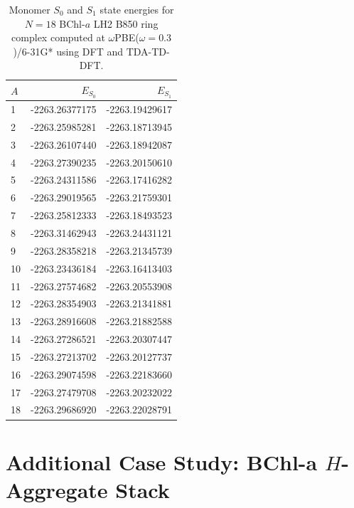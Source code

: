 \begin{table}[h!]
\begin{center}
\caption{
Monomer $S_0$ and $S_1$ state energies for $N=18$ BChl-$a$ LH2 B850 ring
complex computed at $\omega$PBE($\omega=0.3$)/6-31G* using DFT and TDA-TD-DFT.}
\label{tab:E}
\begin{tabular}{lrr}
\hline \hline
$A$ & $E_{S_0}$ & $E_{S_1}$ \\
\hline
 1 & -2263.26377175 & -2263.19429617 \\
 2 & -2263.25985281 & -2263.18713945 \\
 3 & -2263.26107440 & -2263.18942087 \\
 4 & -2263.27390235 & -2263.20150610 \\
 5 & -2263.24311586 & -2263.17416282 \\
 6 & -2263.29019565 & -2263.21759301 \\
 7 & -2263.25812333 & -2263.18493523 \\
 8 & -2263.31462943 & -2263.24431121 \\
 9 & -2263.28358218 & -2263.21345739 \\
10 & -2263.23436184 & -2263.16413403 \\
11 & -2263.27574682 & -2263.20553908 \\
12 & -2263.28354903 & -2263.21341881 \\
13 & -2263.28916608 & -2263.21882588 \\
14 & -2263.27286521 & -2263.20307447 \\
15 & -2263.27213702 & -2263.20127737 \\
16 & -2263.29074598 & -2263.22183660 \\
17 & -2263.27479708 & -2263.20232022 \\
18 & -2263.29686920 & -2263.22028791 \\
\hline \hline
\end{tabular}
\end{center}
\end{table}

\section{Additional Case Study: BChl-a $H$-Aggregate Stack}

